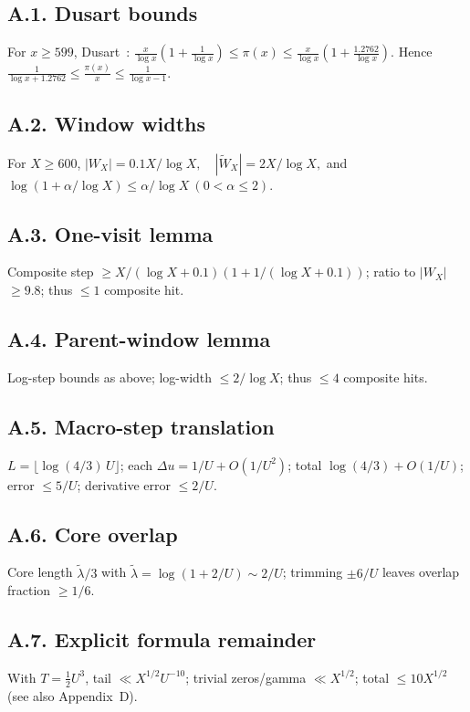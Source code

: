 \documentclass[11pt]{article}
\theoremstyle{plain}
\theoremstyle{definition}
\theoremstyle{remark}
\begin{document}
\subsection*{A.1. Dusart bounds}
For $x\ge 599$, Dusart~\cite[Thm.~1.10]{Dusart2010}:
\(
\frac{x}{\log x}(1+\frac{1}{\log x})\le \pi(x)\le \frac{x}{\log x}(1+\frac{1.2762}{\log x}).
\)
Hence
\(
\frac{1}{\log x+1.2762}\le \frac{\pi(x)}{x}\le \frac{1}{\log x-1}.
\)

\subsection*{A.2. Window widths}
For $X\ge 600$,
\(
|W_X|=0.1X/\log X,\quad |\widetilde W_X|=2X/\log X,
\)
and
\(
\log(1+\alpha/\log X)\le \alpha/\log X \ (0<\alpha\le 2).
\)

\subsection*{A.3. One-visit lemma}
Composite step $\ge X/(\log X+0.1)(1+1/(\log X+0.1))$; ratio to $|W_X|$ $\ge 9.8$; thus $\le 1$ composite hit.

\subsection*{A.4. Parent-window lemma}
Log-step bounds as above; log-width $\le 2/\log X$; thus $\le 4$ composite hits.

\subsection*{A.5. Macro-step translation}
$L=\lfloor \log(4/3)\,U\rfloor$; each $\Delta u=1/U+O(1/U^2)$; total $\log(4/3)+O(1/U)$; error $\le 5/U$; derivative error $\le 2/U$.

\subsection*{A.6. Core overlap}
Core length $\tilde\lambda/3$ with $\tilde\lambda=\log(1+2/U)\sim 2/U$; trimming $\pm 6/U$ leaves overlap fraction $\ge 1/6$.

\subsection*{A.7. Explicit formula remainder}
With $T=\tfrac12 U^3$, tail $\ll X^{1/2}U^{-10}$; trivial zeros/gamma $\ll X^{1/2}$; total $\le 10X^{1/2}$ (see also Appendix~D).
\end{document}
